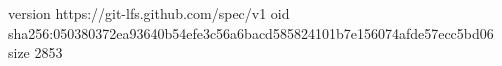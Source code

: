 version https://git-lfs.github.com/spec/v1
oid sha256:050380372ea93640b54efe3c56a6bacd585824101b7e156074afde57ecc5bd06
size 2853
